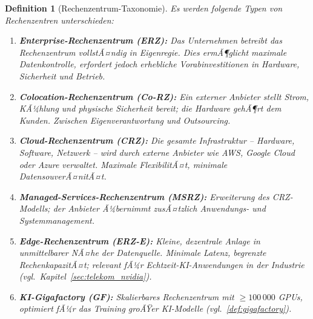 ﻿\documentclass[12pt, a4paper, openany]{report}
\newtheorem{definition}[theorem]{Definition}
\begin{document}
\begin{definition}[Rechenzentrum-Taxonomie]
	\label{def:rz_taxonomie}
	Es werden folgende Typen von Rechenzentren unterschieden:
	\begin{enumerate}[label=(\roman*)]
		\item \textbf{Enterprise-Rechenzentrum (ERZ):} Das Unternehmen betreibt
		das Rechenzentrum vollstÃ¤ndig in Eigenregie. Dies ermÃ¶glicht maximale
		Datenkontrolle, erfordert jedoch erhebliche Vorabinvestitionen in
		Hardware, Sicherheit und Betrieb.
		\item \textbf{Colocation-Rechenzentrum (Co-RZ):} Ein externer Anbieter
		stellt Strom, KÃ¼hlung und physische Sicherheit bereit; die Hardware
		gehÃ¶rt dem Kunden. Zwischen Eigenverantwortung und Outsourcing.
		\item \textbf{Cloud-Rechenzentrum (CRZ):} Die gesamte Infrastruktur --
		Hardware, Software, Netzwerk -- wird durch externe Anbieter wie AWS,
		Google Cloud oder Azure verwaltet. Maximale FlexibilitÃ¤t, minimale
		DatensouverÃ¤nitÃ¤t.
		\item \textbf{Managed-Services-Rechenzentrum (MSRZ):} Erweiterung des
		CRZ-Modells; der Anbieter Ã¼bernimmt zusÃ¤tzlich Anwendungs- und
		Systemmanagement.
		\item \textbf{Edge-Rechenzentrum (ERZ-E):} Kleine, dezentrale Anlage in
		unmittelbarer NÃ¤he der Datenquelle. Minimale Latenz, begrenzte
		RechenkapazitÃ¤t; relevant fÃ¼r Echtzeit-KI-Anwendungen in der
		Industrie (vgl.\ Kapitel~\ref{sec:telekom_nvidia}).
		\item \textbf{KI-Gigafactory (GF):} Skalierbares Rechenzentrum mit
		$\geq 100\,000$ GPUs, optimiert fÃ¼r das Training groÃŸer KI-Modelle
		(vgl.\ \cref{def:gigafactory}).
	\end{enumerate}
\end{definition}
\end{document}
